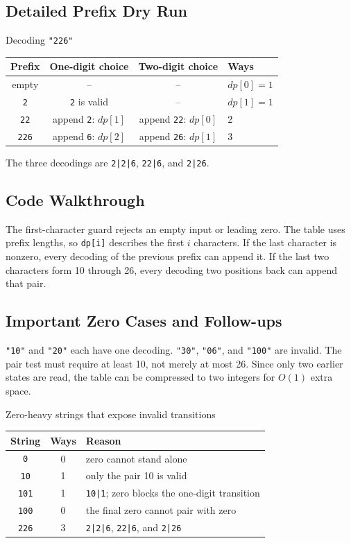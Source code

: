 \subsection{Detailed Prefix Dry Run}
\begin{dryrunbox}{Decoding \texttt{"226"}}
\begin{center}
\begin{tabularx}{\linewidth}{@{}c c c X@{}}
\toprule
Prefix & One-digit choice & Two-digit choice & Ways \\
\midrule
empty & -- & -- & \(dp[0]=1\) \\
\texttt{2} & \texttt{2} is valid & -- & \(dp[1]=1\) \\
\texttt{22} & append \texttt{2}: \(dp[1]\) & append \texttt{22}: \(dp[0]\) & 2 \\
\texttt{226} & append \texttt{6}: \(dp[2]\) & append \texttt{26}: \(dp[1]\) & 3 \\
\bottomrule
\end{tabularx}
\end{center}
The three decodings are \texttt{2|2|6}, \texttt{22|6}, and
\texttt{2|26}.
\end{dryrunbox}

\subsection{Code Walkthrough}
The first-character guard rejects an empty input or leading zero. The table
uses prefix lengths, so \texttt{dp[i]} describes the first \(i\) characters.
If the last character is nonzero, every decoding of the previous prefix can
append it. If the last two characters form 10 through 26, every decoding two
positions back can append that pair.

\subsection{Important Zero Cases and Follow-ups}
\texttt{"10"} and \texttt{"20"} each have one decoding. \texttt{"30"},
\texttt{"06"}, and \texttt{"100"} are invalid. The pair test must require at
least 10, not merely at most 26. Since only two earlier states are read, the
table can be compressed to two integers for \(O(1)\) extra space.

\begin{dryrunbox}{Zero-heavy strings that expose invalid transitions}
\begin{center}
\begin{tabularx}{\linewidth}{@{}c c X@{}}
\toprule
String & Ways & Reason \\
\midrule
\texttt{0} & 0 & zero cannot stand alone \\
\texttt{10} & 1 & only the pair 10 is valid \\
\texttt{101} & 1 & \texttt{10|1}; zero blocks the one-digit transition \\
\texttt{100} & 0 & the final zero cannot pair with zero \\
\texttt{226} & 3 & \texttt{2|2|6}, \texttt{22|6}, and \texttt{2|26} \\
\bottomrule
\end{tabularx}
\end{center}
\end{dryrunbox}

